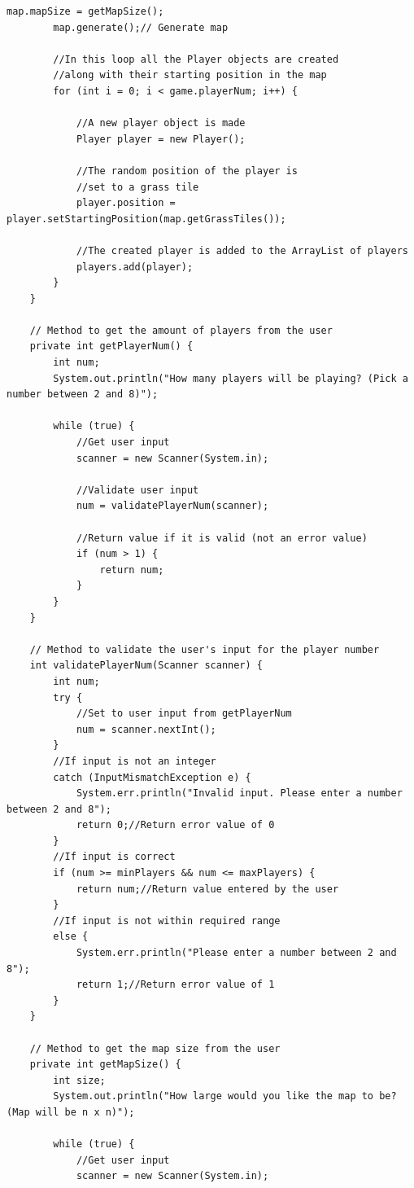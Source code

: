 \documentclass[a4paper,12pt]{extarticle}
\begin{document}
\begin{lstlisting}[caption=The initial code of the Game class, label=amb]
        map.mapSize = getMapSize();
        map.generate();// Generate map

        //In this loop all the Player objects are created 
        //along with their starting position in the map
        for (int i = 0; i < game.playerNum; i++) {

            //A new player object is made
            Player player = new Player();

            //The random position of the player is 
            //set to a grass tile
            player.position = player.setStartingPosition(map.getGrassTiles());

            //The created player is added to the ArrayList of players
            players.add(player);
        }
    }

    // Method to get the amount of players from the user
    private int getPlayerNum() {
        int num;
        System.out.println("How many players will be playing? (Pick a number between 2 and 8)");

        while (true) {
            //Get user input
            scanner = new Scanner(System.in);

            //Validate user input
            num = validatePlayerNum(scanner);

            //Return value if it is valid (not an error value)
            if (num > 1) {
                return num;
            }
        }
    }

    // Method to validate the user's input for the player number
    int validatePlayerNum(Scanner scanner) {
        int num;
        try {
            //Set to user input from getPlayerNum
            num = scanner.nextInt();
        }
        //If input is not an integer
        catch (InputMismatchException e) {
            System.err.println("Invalid input. Please enter a number between 2 and 8");
            return 0;//Return error value of 0
        }
        //If input is correct
        if (num >= minPlayers && num <= maxPlayers) {
            return num;//Return value entered by the user
        }
        //If input is not within required range
        else {
            System.err.println("Please enter a number between 2 and 8");
            return 1;//Return error value of 1
        }
    }

    // Method to get the map size from the user
    private int getMapSize() {
        int size;
        System.out.println("How large would you like the map to be? (Map will be n x n)");

        while (true) {
            //Get user input
            scanner = new Scanner(System.in);


\end{lstlisting}
\end{document}
